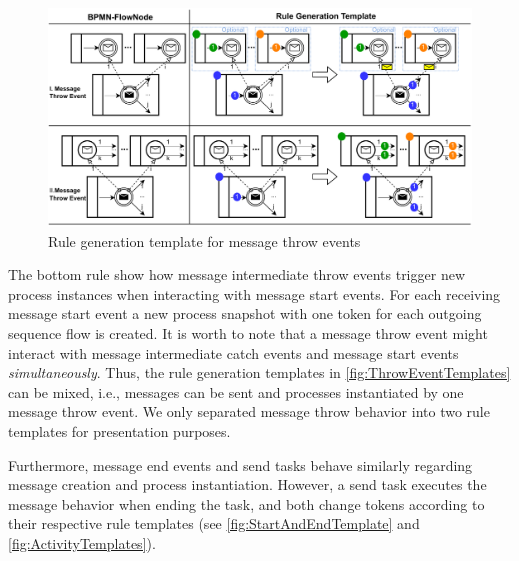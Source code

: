 \documentclass[submission, copyright, creativecommons]{eptcs}
\begin{document}
\begin{figure}[h]
    \centering
    \includegraphics[width=1\textwidth]{images/throw_messages.pdf}
    \caption{Rule generation template for message throw events}
    \label{fig:ThrowEventTemplates}
\end{figure}

The bottom rule show how message intermediate throw events trigger new process instances when interacting with message start events.
For each receiving message start event a new process snapshot with one token for each outgoing sequence flow is created.
It is worth to note that a message throw event might interact with message intermediate catch events and message start events \textit{simultaneously}.
Thus, the rule generation templates in \autoref{fig:ThrowEventTemplates} can be mixed, i.e., messages can be sent and processes instantiated by one message throw event.
We only separated message throw behavior into two rule templates for presentation purposes.

Furthermore, message end events and send tasks behave similarly regarding message creation and process instantiation.
However, a send task executes the message behavior when ending the task, and both change tokens according to their respective rule templates (see \autoref{fig:StartAndEndTemplate} and \autoref{fig:ActivityTemplates}).
\end{document}
